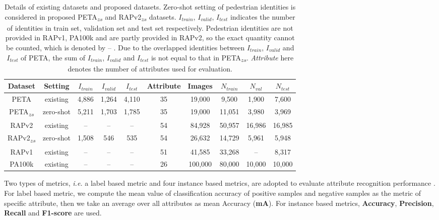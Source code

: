 \documentclass[runningheads]{llncs}
\begin{document}
\begin{table}[ht]
    \centering
        \caption{Details of existing datasets and proposed datasets. Zero-shot setting of pedestrian identities is considered in proposed PETA\textsubscript{$zs$} and RAPv2\textsubscript{$zs$} datasets. $I_{train}$, $I_{valid}$, $I_{test}$ indicates the number of identities in train set, validation set and test set respectively. Pedestrian identities are not provided in RAPv1, PA100k and are partly provided in RAPv2, so the exact quantity cannot be counted, which is denoted by -- . Due to the overlapped identities between $I_{train}$, $I_{valid}$ and $I_{test}$ of PETA, the sum of $I_{train}$, $I_{valid}$ and $I_{test}$ is not equal to that in PETA\textsubscript{$zs$}. \textit{Attribute} here denotes the number of attributes used for evaluation.}
    \label{tab:dataset_partition}

    \begin{tabular}{c|c|c|c|c|c|c|c|c|c}
    \toprule
        Dataset & Setting & $I_{train}$ & $I_{valid}$ & $I_{test}$  & Attribute & Images & $N_{train}$ & $N_{val}$ & $N_{test}$ \\ \hline \hline
        PETA & existing & 4,886 & 1,264  & 4,110  & 35 & 19,000 & 9,500 & 1,900 & 7,600 \\
        PETA\textsubscript{$zs$} & zero-shot & 5,211 & 1,703 & 1,785 & 35 & 19,000 & 11,051 & 3,980 & 3,969 \\
        RAPv2 & existing & -- & -- & --  & 54 & 84,928 & 50,957 & 16,986 & 16,985 \\
        RAPv2\textsubscript{$zs$} & zero-shot & 1,508 & 546 & 535  & 54 & 26,632 & 14,729 & 5,961 & 5,948 \\
        RAPv1 & existing & -- & -- & -- & 51 & 41,585 & 33,268 & -- & 8,317 \\
        PA100k & existing & -- & -- & -- & 26 & 100,000 & 80,000 & 10,000 & 10,000  \\
    \bottomrule
    \end{tabular}
    \vspace{-2em}
\end{table}

Two types of metrics, \textit{i.e.} a label based metric and four instance based metrics, are adopted to evaluate attribute recognition performance \cite{li2018richly}. For label based metric, we compute the mean value of classification accuracy of positive samples and negative samples as the metric of specific attribute, then we take an average over all attributes as mean Accuracy ({\bf mA}). For instance based metrics, {\bf Accuracy}, {\bf Precision}, {\bf Recall} and {\bf F1-score} are used.
\end{document}

